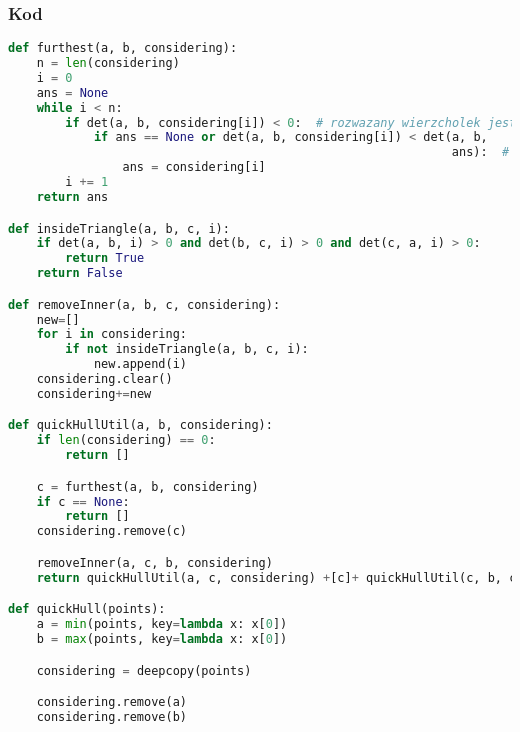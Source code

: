 \documentclass[11pt]{article}
\theoremstyle{remark} \newtheorem{definition}{def.}
\theoremstyle{definition} \newtheorem{twierdzenie}{tw.}
\begin{document}
    \subsubsection{Kod}
\begin{lstlisting}[language=Python]
def furthest(a, b, considering):
    n = len(considering)
    i = 0
    ans = None
    while i < n:
        if det(a, b, considering[i]) < 0:  # rozwazany wierzcholek jest po prawej stronie ab
            if ans == None or det(a, b, considering[i]) < det(a, b,
                                                              ans):  # |det(a,b,c)| = 1/2|ab|*h, gdzie h jest wysokoscia z c na ab
                ans = considering[i]
        i += 1
    return ans

def insideTriangle(a, b, c, i):
    if det(a, b, i) > 0 and det(b, c, i) > 0 and det(c, a, i) > 0:
        return True
    return False

def removeInner(a, b, c, considering):
    new=[]
    for i in considering:
        if not insideTriangle(a, b, c, i):
            new.append(i)
    considering.clear()
    considering+=new

def quickHullUtil(a, b, considering):
    if len(considering) == 0:
        return []

    c = furthest(a, b, considering)
    if c == None:
        return []
    considering.remove(c)

    removeInner(a, c, b, considering)
    return quickHullUtil(a, c, considering) +[c]+ quickHullUtil(c, b, considering)

def quickHull(points):
    a = min(points, key=lambda x: x[0])
    b = max(points, key=lambda x: x[0])

    considering = deepcopy(points)

    considering.remove(a)
    considering.remove(b)
\end{lstlisting}


    \medskip

\end{document}
